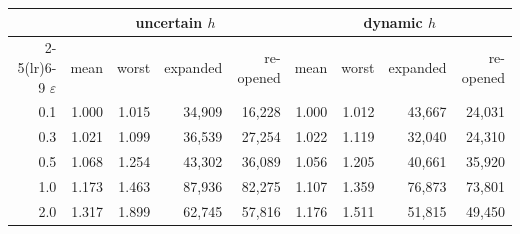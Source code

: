 \begin{tabular}{r rrrr rrrr}
\toprule
 & \multicolumn{4}{c}{uncertain $h$} & \multicolumn{4}{c}{dynamic $h$} \\
\cmidrule(lr){2-5}\cmidrule(lr){6-9}
$\varepsilon$ & mean & worst & expanded & re-opened & mean & worst & expanded & re-opened \\
\midrule
0.1 & 1.000 & 1.015 & 34{,}909 & 16{,}228 & 1.000 & 1.012 & 43{,}667 & 24{,}031 \\
0.3 & 1.021 & 1.099 & 36{,}539 & 27{,}254 & 1.022 & 1.119 & 32{,}040 & 24{,}310 \\
0.5 & 1.068 & 1.254 & 43{,}302 & 36{,}089 & 1.056 & 1.205 & 40{,}661 & 35{,}920 \\
1.0 & 1.173 & 1.463 & 87{,}936 & 82{,}275 & 1.107 & 1.359 & 76{,}873 & 73{,}801 \\
2.0 & 1.317 & 1.899 & 62{,}745 & 57{,}816 & 1.176 & 1.511 & 51{,}815 & 49{,}450 \\
\bottomrule
\end{tabular}

